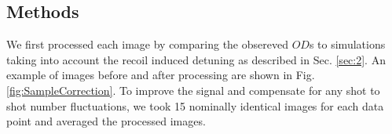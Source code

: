 \documentclass[12pt]{iopart}
\begin{document}
\subsection{Methods}
\par We first processed each image by comparing the obsereved $OD$s to simulations taking into account the recoil induced detuning as described in Sec. \ref{sec:2}. An example of images before and after processing are shown in Fig. \ref{fig:SampleCorrection}.  To improve the signal and compensate for any shot to shot number fluctuations, we took 15 nominally identical images for each data point and averaged the processed images.
\begin{figure}

\end{figure}
\end{document}
